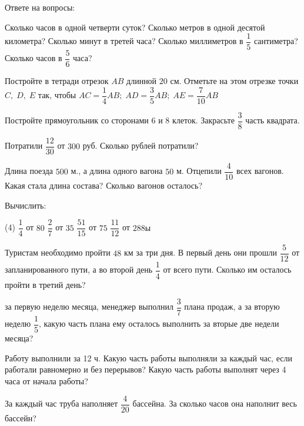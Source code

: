 \begin{class}[number=4]
	\begin{listofex}
	\item Ответе на вопросы:
	\begin{tasks}
		\task Сколько часов в одной четверти суток?
		\task Сколько метров в одной десятой километра?
		\task Сколько минут в третей часа?
		\task Сколько миллиметров в \( \dfrac{1}{5} \) сантиметра?
		\task Сколько часов в \( \dfrac{5}{6} \) часа?
	\end{tasks}
	\item Постройте в тетради отрезок \( AB \) длинной \( 20 \) см. Отметьте на этом отрезке точки \( C,\;D,\;E \) так, чтобы \( AC=\dfrac{1}{4}AB;\;AD=\dfrac{3}{5}AB;\;AE=\dfrac{7}{10}AB \)
	\item Постройте прямоугольник со сторонами \( 6 \) и \( 8 \) клеток. Закрасьте \( \dfrac{3}{8} \) часть квадрата.
	\item Потратили \( \dfrac{12}{30} \) от \( 300 \) руб. Сколько рублей потратили?
	\item Длина поезда \( 500 \) м., а длина одного вагона \( 50 \) м. Отцепили \( \dfrac{4}{10} \) всех вагонов. Какая стала длина состава? Сколько вагонов осталось?
	\item Вычислить:
	\begin{tasks}(4)
		\task \( \dfrac{1}{4} \) от \( 80 \)
		\task \( \dfrac{2}{7} \) от \( 35 \)
		\task \( \dfrac{51}{15} \) от \( 75 \)
		\task \( \dfrac{11}{12} \) от \( 288ы \)
	\end{tasks}
	\item Туристам необходимо пройти \( 48 \) км за три дня. В первый день они прошли \( \dfrac{5}{12} \) от запланированного пути, а во второй день \( \dfrac{1}{4} \) от всего пути. Сколько им осталось пройти в третий день?
	\item за первую неделю месяца, менеджер выполнил \( \dfrac{3}{7} \) плана продаж, а за вторую неделю \( \dfrac{1}{5} \), какую часть плана ему осталось выполнить за вторые две недели месяца?
	\item Работу выполнили за 12 ч. Какую часть работы выполняли за каждый час, если работали равномерно и без перерывов? Какую часть работы выполнят через 4 часа от начала работы?
	\item За каждый час труба наполняет \( \dfrac{4}{20} \) бассейна. За сколько часов она наполнит весь бассейн?
	\end{listofex}
\end{class}

